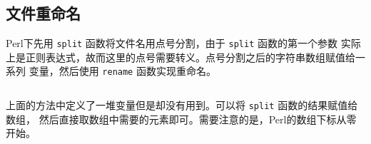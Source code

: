 \subsection{文件重命名}
\label{subsec:rename-in-perl}
Perl下先用 \texttt{split} 函数将文件名用点号分割，由于 \texttt{split} 函数的第一个参数
实际上是正则表达式，故而这里的点号需要转义。点号分割之后的字符串数组赋值给一系列
变量，然后使用 \texttt{rename} 函数实现重命名。
\inputminted{perl}{./call-in-script/rename1.pl}

上面的方法中定义了一堆变量但是却没有用到。可以将 \texttt{split} 函数的结果赋值给数组，
然后直接取数组中需要的元素即可。需要注意的是，Perl的数组下标从零开始。
\inputminted{perl}{./call-in-script/rename2.pl}
